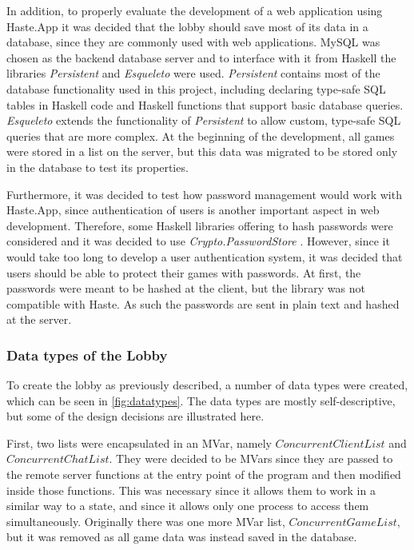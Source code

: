 \documentclass[a4paper]{article}
\begin{document}
In addition, to properly evaluate the development of a web application using Haste.App it was decided that the lobby should save most of its data in a database, since they are commonly used with web applications. MySQL was chosen as the backend database server and to interface with it from Haskell the libraries \textit{Persistent} \cite{persistent-yesod} and \textit{Esqueleto} \cite{esqueleto-hackage} were used. \textit{Persistent} contains most of the database functionality used in this project, including declaring type-safe SQL tables in Haskell code and Haskell functions that support basic database queries. \textit{Esqueleto} extends the functionality of \textit{Persistent} to allow  custom, type-safe SQL queries that are more complex. At the beginning of the development, all games were stored in a list on the server, but this data was migrated to be stored only in the database to test its properties.

Furthermore, it was decided to test how password management would work with Haste.App, since authentication of users is another important aspect in web development. Therefore, some Haskell libraries offering to hash passwords were considered and it was decided to use \textit{Crypto.PasswordStore} \cite{pwstore-package}. However, since it would take too long to develop a user authentication system, it was decided that users should be able to protect their games with passwords. At first, the passwords were meant to be hashed at the client, but the library was not compatible with Haste. As such the passwords are sent in plain text and hashed at the server.



\subsubsection{Data types of the Lobby}
To create the lobby as previously described, a number of data types were created, which can be seen in \cref{fig:datatypes}. The data types are mostly self-descriptive, but some of the design decisions are illustrated here.

First, two lists were encapsulated in an MVar, namely $ConcurrentClientList$ and $ConcurrentChatList$. They were decided to be MVars since they are passed to the remote server functions at the entry point of the program and then modified inside those functions. This was necessary since it allows them to work in a similar way to a state, and since it allows only one process to access them simultaneously. Originally there was one more MVar list, $ConcurrentGameList$, but it was removed as all game data was instead saved in the database.
\end{document}
